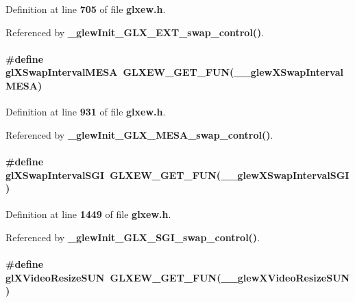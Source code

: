 Definition at line {\bf 705} of file {\bf glxew.\+h}.



Referenced by {\bf \+\_\+glew\+Init\+\_\+\+G\+L\+X\+\_\+\+E\+X\+T\+\_\+swap\+\_\+control()}.

\paragraph[{gl\+X\+Swap\+Interval\+M\+E\+SA}]{\setlength{\rightskip}{0pt plus 5cm}\#define gl\+X\+Swap\+Interval\+M\+E\+SA~{\bf G\+L\+X\+E\+W\+\_\+\+G\+E\+T\+\_\+\+F\+UN}({\bf \+\_\+\+\_\+glew\+X\+Swap\+Interval\+M\+E\+SA})}\label{glxew_8h_a85d0c31db6dcef9db71c11f3524cd427}


Definition at line {\bf 931} of file {\bf glxew.\+h}.



Referenced by {\bf \+\_\+glew\+Init\+\_\+\+G\+L\+X\+\_\+\+M\+E\+S\+A\+\_\+swap\+\_\+control()}.

\paragraph[{gl\+X\+Swap\+Interval\+S\+GI}]{\setlength{\rightskip}{0pt plus 5cm}\#define gl\+X\+Swap\+Interval\+S\+GI~{\bf G\+L\+X\+E\+W\+\_\+\+G\+E\+T\+\_\+\+F\+UN}({\bf \+\_\+\+\_\+glew\+X\+Swap\+Interval\+S\+GI})}\label{glxew_8h_a8f05a01089c48d69a5bbcdb453b774b2}


Definition at line {\bf 1449} of file {\bf glxew.\+h}.



Referenced by {\bf \+\_\+glew\+Init\+\_\+\+G\+L\+X\+\_\+\+S\+G\+I\+\_\+swap\+\_\+control()}.

\paragraph[{gl\+X\+Video\+Resize\+S\+UN}]{\setlength{\rightskip}{0pt plus 5cm}\#define gl\+X\+Video\+Resize\+S\+UN~{\bf G\+L\+X\+E\+W\+\_\+\+G\+E\+T\+\_\+\+F\+UN}({\bf \+\_\+\+\_\+glew\+X\+Video\+Resize\+S\+UN})}\label{glxew_8h_ad113f66233b4c2da9d98945702396708}


